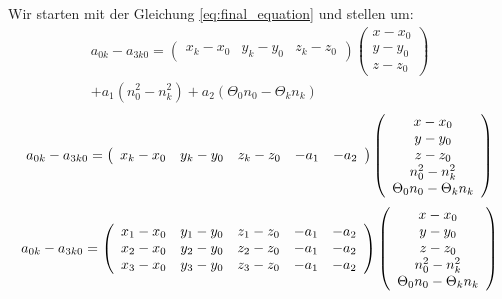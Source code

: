 {
Wir starten mit der Gleichung \eqref{eq:final_equation} und stellen um:
%
\begin{multline}
a_{0k}-a_{3k0}=
\left(
	\begin{array}{ccc}
		x_k-x_0 & y_k-y_0 & z_k-z_0 
	\end{array}
\right)
\left(
   \begin{array}{c}
	   x-x_0\\
	   y-y_0\\
	   z-z_0
   \end{array}
\right) \\
+a_1(n_0^2-n_k^2)+a_2(\Theta_0n_0-\Theta_kn_k)
\end{multline}
%
\begin{equation}
a_{0k}-a_{3k0}=
\left(
	\begin{array}{*5{c}}
		x_k-x_0 & y_k-y_0 & z_k-z_0 & -a_1 & -a_2
	\end{array}
\right)
\left(
   \begin{array}{c}
	   x-x_0\\
	   y-y_0\\
	   z-z_0\\
	   n_0^2-n_k^2\\
	   \Theta_0n_0-\Theta_kn_k
   \end{array}
\right)
\end{equation}
%
\begin{equation}
a_{0k}-a_{3k0}=
\left(
	\begin{array}{*5{c}}
		x_1-x_0 & y_1-y_0 & z_1-z_0 & -a_1 & -a_2\\
		x_2-x_0 & y_2-y_0 & z_2-z_0 & -a_1 & -a_2\\
		x_3-x_0 & y_3-y_0 & z_3-z_0 & -a_1 & -a_2
	\end{array}
\right)
\left(
   \begin{array}{c}
	   x-x_0\\
	   y-y_0\\
	   z-z_0\\
	   n_0^2-n_k^2\\
	   \Theta_0n_0-\Theta_kn_k
   \end{array}
\right)
\end{equation}
}